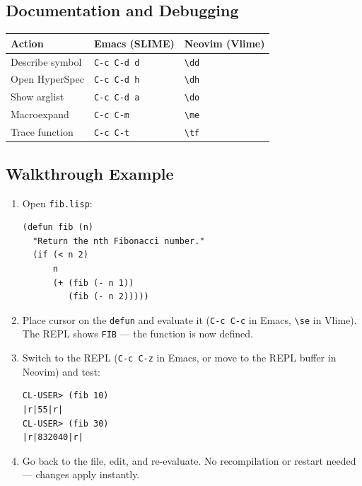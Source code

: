 \documentclass[a4paper,11pt]{article}
\newcommand{\key}[1]{\texttt{#1}}
\newcommand{\file}[1]{\texttt{#1}}
\begin{document}
\subsection{Documentation and Debugging}

\begin{center}
\begin{tabular}{lll}
  \toprule
  \textbf{Action} & \textbf{Emacs (SLIME)} & \textbf{Neovim (Vlime)} \\
  \midrule
  Describe symbol           & \key{C-c C-d d} & \key{\textbackslash dd} \\
  Open HyperSpec            & \key{C-c C-d h} & \key{\textbackslash dh} \\
  Show arglist              & \key{C-c C-d a} & \key{\textbackslash do} \\
  Macroexpand               & \key{C-c C-m}   & \key{\textbackslash me} \\
  Trace function            & \key{C-c C-t}   & \key{\textbackslash tf} \\
  \bottomrule
\end{tabular}
\end{center}

\subsection{Walkthrough Example}

\begin{enumerate}
  \item Open \file{fib.lisp}:

\begin{lstlisting}
(defun fib (n)
  "Return the nth Fibonacci number."
  (if (< n 2)
      n
      (+ (fib (- n 1))
         (fib (- n 2)))))
\end{lstlisting}

  \item Place cursor on the \texttt{defun} and evaluate it
        (\key{C-c C-c} in Emacs, \key{\textbackslash se} in Vlime).
        The REPL shows \texttt{FIB} --- the function is now defined.

  \item Switch to the REPL
        (\key{C-c C-z} in Emacs, or move to the REPL buffer in Neovim)
        and test:

\begin{lstlisting}[style=repl]
CL-USER> (fib 10)
|r|55|r|
CL-USER> (fib 30)
|r|832040|r|
\end{lstlisting}

  \item Go back to the file, edit, and re-evaluate.
        No recompilation or restart needed --- changes apply instantly.
\end{enumerate}
\end{document}

